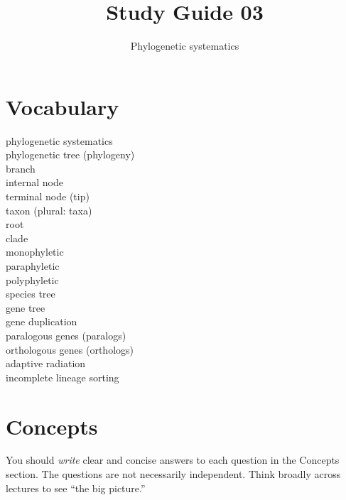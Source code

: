 \documentclass[letterpaper]{tufte-handout}
\title{Study Guide 03\hfill}
\author{Phylogenetic systematics}
\date{} %
\begin{document}
\maketitle	%


\section{Vocabulary}
\vspace{-1\baselineskip}
\begin{multicols}{2}
	phylogenetic systematics\\
	phylogenetic tree (phylogeny)\\
	branch \\
	internal node\\
	terminal node (tip) \\
	taxon (plural: taxa) \\
	root \\
	clade \\
	monophyletic \\
	paraphyletic \\
	polyphyletic \\
	species tree \\
	gene tree \\
	gene duplication \\
	paralogous genes (paralogs) \\
	orthologous genes (orthologs) \\
	adaptive radiation \\
	incomplete lineage sorting \\
\end{multicols}

\section{Concepts}

You should \emph{write} clear and concise answers to each question in the Concepts section.  The questions are not necessarily independent.  Think broadly across lectures to see ``the big picture.'' 
\end{document}

